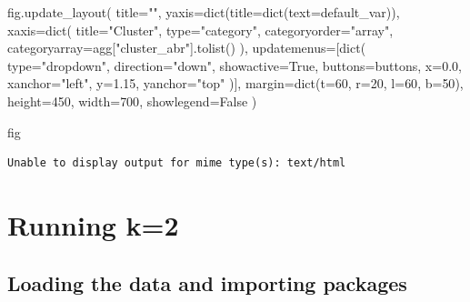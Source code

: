 \documentclass[
  letterpaper,
  DIV=11,
  numbers=noendperiod]{scrreprt}
\newenvironment{Shaded}{\begin{snugshade}}{\end{snugshade}}
\newcommand{\BuiltInTok}[1]{\textcolor[rgb]{0.00,0.23,0.31}{#1}}
\newcommand{\DecValTok}[1]{\textcolor[rgb]{0.68,0.00,0.00}{#1}}
\newcommand{\FloatTok}[1]{\textcolor[rgb]{0.68,0.00,0.00}{#1}}
\newcommand{\NormalTok}[1]{\textcolor[rgb]{0.00,0.23,0.31}{#1}}
\newcommand{\OperatorTok}[1]{\textcolor[rgb]{0.37,0.37,0.37}{#1}}
\newcommand{\StringTok}[1]{\textcolor[rgb]{0.13,0.47,0.30}{#1}}
\newcommand{\VariableTok}[1]{\textcolor[rgb]{0.07,0.07,0.07}{#1}}
\begin{document}
\begin{Shaded}
\begin{Highlighting}[]
\NormalTok{fig.update\_layout(}
\NormalTok{    title}\OperatorTok{=}\StringTok{""}\NormalTok{,}
\NormalTok{    yaxis}\OperatorTok{=}\BuiltInTok{dict}\NormalTok{(title}\OperatorTok{=}\BuiltInTok{dict}\NormalTok{(text}\OperatorTok{=}\NormalTok{default\_var)),}
\NormalTok{    xaxis}\OperatorTok{=}\BuiltInTok{dict}\NormalTok{(}
\NormalTok{        title}\OperatorTok{=}\StringTok{"Cluster"}\NormalTok{,}
        \BuiltInTok{type}\OperatorTok{=}\StringTok{"category"}\NormalTok{,}
\NormalTok{        categoryorder}\OperatorTok{=}\StringTok{"array"}\NormalTok{,}
\NormalTok{        categoryarray}\OperatorTok{=}\NormalTok{agg[}\StringTok{"cluster\_abr"}\NormalTok{].tolist()}
\NormalTok{    ),}
\NormalTok{    updatemenus}\OperatorTok{=}\NormalTok{[}\BuiltInTok{dict}\NormalTok{(}
        \BuiltInTok{type}\OperatorTok{=}\StringTok{"dropdown"}\NormalTok{,}
\NormalTok{        direction}\OperatorTok{=}\StringTok{"down"}\NormalTok{,}
\NormalTok{        showactive}\OperatorTok{=}\VariableTok{True}\NormalTok{,}
\NormalTok{        buttons}\OperatorTok{=}\NormalTok{buttons,}
\NormalTok{        x}\OperatorTok{=}\FloatTok{0.0}\NormalTok{, xanchor}\OperatorTok{=}\StringTok{"left"}\NormalTok{,}
\NormalTok{        y}\OperatorTok{=}\FloatTok{1.15}\NormalTok{, yanchor}\OperatorTok{=}\StringTok{"top"}
\NormalTok{    )],}
\NormalTok{    margin}\OperatorTok{=}\BuiltInTok{dict}\NormalTok{(t}\OperatorTok{=}\DecValTok{60}\NormalTok{, r}\OperatorTok{=}\DecValTok{20}\NormalTok{, l}\OperatorTok{=}\DecValTok{60}\NormalTok{, b}\OperatorTok{=}\DecValTok{50}\NormalTok{),}
\NormalTok{    height}\OperatorTok{=}\DecValTok{450}\NormalTok{, width}\OperatorTok{=}\DecValTok{700}\NormalTok{,}
\NormalTok{    showlegend}\OperatorTok{=}\VariableTok{False}
\NormalTok{)}


\NormalTok{fig}
\end{Highlighting}
\end{Shaded}

\begin{verbatim}
Unable to display output for mime type(s): text/html
\end{verbatim}

\chapter{Running k=2}\label{running-k2}

\section{Loading the data and importing
packages}\label{loading-the-data-and-importing-packages}
\end{document}
